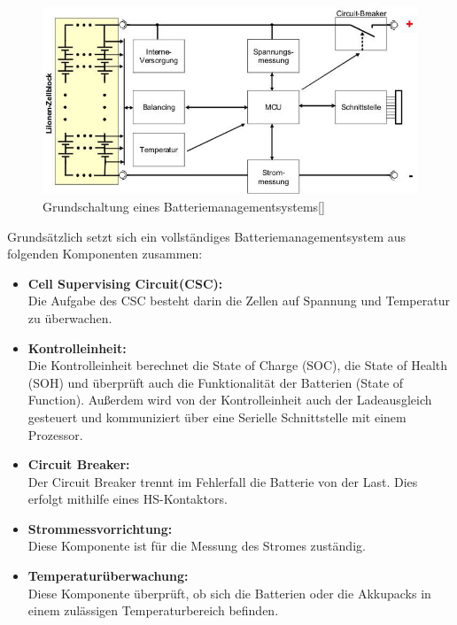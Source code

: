 \begin{figure}[H]
	\begin{center}
		\includegraphics[scale=0.5]{figures/Akku/bms-1schaltunggrund.jpg}
		\caption{Grundschaltung eines Batteriemanagementsystems[\cite{GrundschaltungBMS}]}
		\label{Grundschaltung eines Batteriemanagementsystems}
	\end{center}
\end{figure}

Grundsätzlich setzt sich ein vollständiges Batteriemanagementsystem aus folgenden Komponenten zusammen:
\begin{itemize}
	\item \textbf{Cell Supervising Circuit(CSC):} \medskip\\
	Die Aufgabe des CSC besteht darin die Zellen auf Spannung und 			Temperatur zu überwachen.

	\item \textbf{Kontrolleinheit:}\medskip\\
	Die Kontrolleinheit berechnet die State of Charge (SOC), die State 	of Health (SOH) und überprüft auch die Funktionalität der 				Batterien (State of Function). Außerdem wird von der 					Kontrolleinheit auch der Ladeausgleich gesteuert und kommuniziert 		über eine Serielle Schnittstelle mit einem Prozessor. 

	\item \textbf{Circuit Breaker:}\medskip\\
	Der Circuit Breaker trennt im Fehlerfall die Batterie von der 		Last. Dies erfolgt mithilfe eines HS-Kontaktors.
	
	\item \textbf{Strommessvorrichtung:}\medskip\\
	Diese Komponente ist für die Messung des Stromes zuständig.
	
	\item \textbf{Temperaturüberwachung:}\medskip\\
	Diese Komponente überprüft, ob sich die Batterien oder die 				Akkupacks in einem zulässigen Temperaturbereich befinden.
\end{itemize}
\newpage

